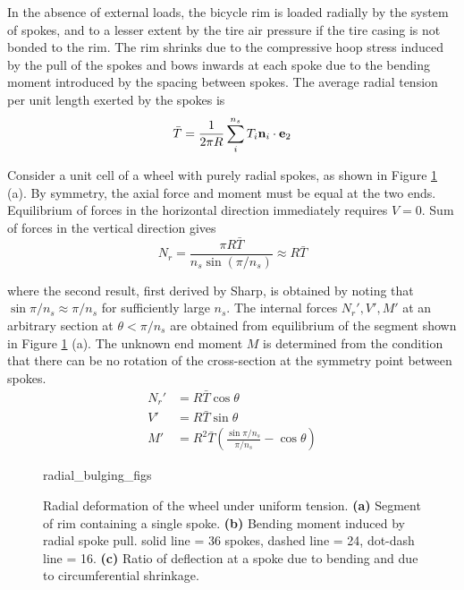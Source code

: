 \documentclass[\rootdir/thesis.tex]{subfiles}
\begin{document}
In the absence of external loads, the bicycle rim is loaded radially by the system of spokes, and to a lesser extent by the tire air pressure if the tire casing is not bonded to the rim\cite{Burgoyne1993}. The rim shrinks due to the compressive hoop stress induced by the pull of the spokes and bows inwards at each spoke due to the bending moment introduced by the spacing between spokes. The average radial tension per unit length exerted by the spokes is
\begin{equation}
\label{eq:Tbar}
\bar{T} = \frac{1}{2\pi R} \sum_i^{n_s} T_i \mathbf{n}_i \cdot\mathbf{e}_2
\end{equation}

Consider a unit cell of a wheel with purely radial spokes, as shown in Figure \ref{fig:radial_bulging} (a). By symmetry, the axial force and moment must be equal at the two ends. Equilibrium of forces in the horizontal direction immediately requires $V=0$. Sum of forces in the vertical direction gives
\begin{equation}
\label{eq:Nr}
N_r = \frac{\pi R\bar{T}}{n_s\sin{(\pi/n_s)}} \approx R\bar{T}
\end{equation}

where the second result, first derived by Sharp\cite{Sharp1977}, is obtained by noting that $\sin{\pi/n_s}\approx \pi/n_s$ for sufficiently large $n_s$. The internal forces $N_r',V',M'$ at an arbitrary section at $\theta < \pi/n_s$ are obtained from equilibrium of the segment shown in Figure \ref{fig:radial_bulging} (a). The unknown end moment $M$ is determined from the condition that there can be no rotation of the cross-section at the symmetry point between spokes.
\begin{subequations}
\begin{align}
\label{eq:NVM}
N_r' &= R\bar{T}\cos{\theta}\\
V'   &= R\bar{T}\sin{\theta}\\
M'   &= R^2\bar{T} \left( \frac{\sin{\pi/n_s}}{\pi/n_s} - \cos{\theta} \right)
\end{align}
\end{subequations}

\begin{figure}
\centering
{radial_bulging_figs}
\caption{Radial deformation of the wheel under uniform tension. \textbf{(a)} Segment of rim containing a single spoke. \textbf{(b)} Bending moment induced by radial spoke pull. solid line = 36 spokes, dashed line = 24, dot-dash line = 16. \textbf{(c)} Ratio of deflection at a spoke due to bending and due to circumferential shrinkage.}
\label{fig:radial_bulging}
\end{figure}
\end{document}
